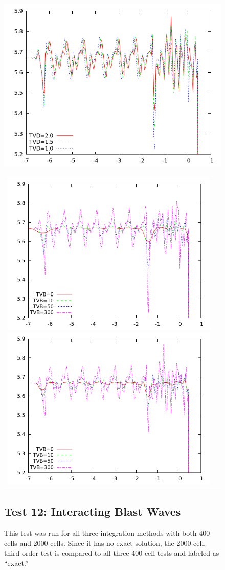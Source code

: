 \documentclass[10pt]{article}
\begin{document}
\begin{figure}[h]
  \begin{center}
     \includegraphics[width=.95\textwidth]{11_300zoom.png}	
	\begin{tabular}{cc}
     \includegraphics[width=.475\textwidth]{11_1zoom.png}
     \includegraphics[width=.475\textwidth]{11_2zoom.png}	
    \end{tabular}
  \end{center}

\clearpage

\subsection{Test 12: Interacting Blast Waves}
This test was run for all three integration methods with both 400 cells and 2000 cells. Since it has no exact solution, the 2000 cell, third order test is compared to all three 400 cell tests and labeled as ``exact.''


\end{figure}
\end{document}
